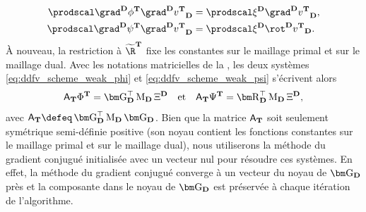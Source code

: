 \begin{subequations}
\label{eq:ddfv_scheme_weak}
\begin{align}
    \prodscalD{\grad^\ensdiamantplat \phi^\ensddfvplat}
               {\grad^\ensdiamantplat v^\ensddfvplat}
    &= \prodscalD{\xi^\ensdiamantplat}
                    {\grad^\ensdiamantplat v^\ensddfvplat},
    \label{eq:ddfv_scheme_weak_phi} \\
    \prodscalD{\grad^\ensdiamantplat \psi^\ensddfvplat}
               {\grad^\ensdiamantplat v^\ensddfvplat}
    &= \prodscalD{\xi^\ensdiamantplat}
                    {\rot^\ensdiamantplat v^\ensddfvplat}.
    \label{eq:ddfv_scheme_weak_psi}
\end{align}
\end{subequations}
À nouveau, la restriction à $\Rddfvmn$ fixe les constantes sur le maillage primal et sur le maillage dual. Avec les notations matricielles de la , les deux systèmes \ref{eq:ddfv_scheme_weak_phi} et \ref{eq:ddfv_scheme_weak_psi} s'écrivent alors
\[
    \mathsf{A}_\ensddfvplat \Phi^\ensddfvplat
    = \gradmat_\ensdiamantplat^\top \masse_\ensdiamantplat \Xi^\ensdiamantplat
    \quad
    \text{et}
    \quad
    \mathsf{A}_\ensddfvplat \Psi^\ensddfvplat
    = \rotmat_\ensdiamantplat^\top \masse_\ensdiamantplat \Xi^\ensdiamantplat,
\]
avec $\mathsf{A}_\ensddfvplat \defeq \gradmat_\ensdiamantplat^\top \masse_\ensdiamantplat \gradmat_\ensdiamantplat$. Bien que la matrice $\mathsf{A}_{\mathbf{T}}$ soit seulement symétrique semi-définie positive (son noyau contient les fonctions constantes sur le maillage primal et sur le maillage dual), nous utiliserons la méthode du gradient conjugué initialisée avec un vecteur nul pour résoudre ces systèmes. En effet, la méthode du gradient conjugué converge à un vecteur du noyau de $\gradmat_\ensdiamantplat$ près et la composante dans le noyau de $\gradmat_\ensdiamantplat$ est préservée à chaque itération de l'algorithme.